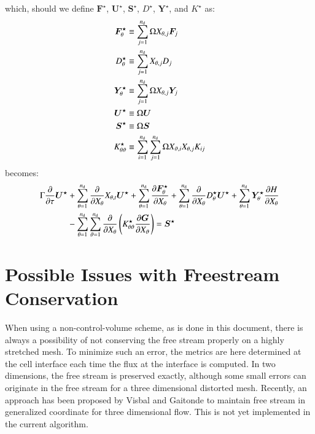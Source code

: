 \documentclass{warpdoc}
\newcommand{\alb}{\vspace{0.2cm}\\} %
\newcommand{\nd}{{{n}_{\rm d}}}
\renewcommand{\vec}[1]{\bm{#1}}
\begin{document}
%
which, should we define $\vec{F}^\star$, $\vec{U}^\star$, $\vec{S}^\star$, $D^\star$, $\vec{Y}^\star$, and $K^\star$ as:
%
\begin{align}
  \vec{F}^\star_\theta &\equiv \sum_{j=1}^\nd  \Omega X_{\theta,j} \vec{F}_j \label{eqn:Fstar}\alb
       D^\star_\theta &\equiv \sum_{j=1}^\nd  X_{\theta,j} D_j \label{eqn:Dstar}\alb
  \vec{Y}^\star_\theta &\equiv \sum_{j=1}^\nd  \Omega X_{\theta,j} \vec{Y}_j \label{eqn:Ystar}\alb
  \vec{U}^\star &\equiv \Omega\vec{U} \label{eqn:Ustar}\alb
  \vec{S}^\star &\equiv \Omega\vec{S} \label{eqn:Sstar}\alb
  K^\star_{\theta\vartheta} &\equiv \sum_{i=1}^\nd \sum_{j=1}^\nd \Omega  X_{\vartheta,i} X_{\theta,j} K_{ij} \label{eqn:Kstar}
\end{align}
%
becomes:
%
\begin{align}
    \Gamma \frac{\partial }{\partial \tau} \vec{U}^\star
    &+ \sum_{\theta=1}^\nd  \frac{\partial }{\partial X_\theta} X_{\theta,t} \vec{U}^\star
    +  \sum_{\theta=1}^\nd \frac{\partial \vec{F}^\star_\theta}{\partial X_\theta} 
    +  \sum_{\theta=1}^\nd \frac{\partial }{\partial X_\theta} D^\star_\theta \vec{U}^\star
    +  \sum_{\theta=1}^\nd \vec{Y}_\theta^\star \frac{\partial H}{\partial X_\theta}\nonumber\alb
    &-  \sum_{\theta=1}^\nd \sum_{\vartheta=1}^\nd
       \frac{\partial}{\partial X_\theta}
       \left( K^\star_{\theta\vartheta} \frac{\partial \vec{G}}{\partial X_\vartheta} \right)
    = \vec{S}^\star
 \label{eqn:goveq10}
\end{align}
%


\section{Possible Issues with Freestream Conservation}

When using a non-control-volume scheme, as is done in this document, there is always
a possibility of not conserving the free stream properly on a highly stretched mesh.
To minimize such an error, the metrics are here determined at the cell interface each
time the flux at the interface is computed. In two dimensions, the free stream is preserved
exactly, although some small errors can originate in the free stream for a three dimensional
distorted mesh. Recently, an approach has been proposed by Visbal and Gaitonde
\cite{jcp:2002:visbal} to maintain free stream in generalized coordinate for three dimensional
flow. This is not yet implemented in the current algorithm.






  
  
\end{document}
